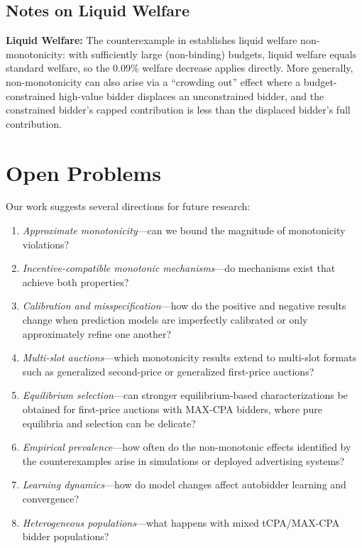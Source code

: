 \documentclass{article}
\theoremstyle{plain}
\theoremstyle{definition}
\theoremstyle{remark}
\begin{document}
\subsection{Notes on Liquid Welfare}
\label{app:counter-notes}

\textbf{Liquid Welfare:} The counterexample in  establishes liquid welfare non-monotonicity: with sufficiently large (non-binding) budgets, liquid welfare equals standard welfare, so the 0.09\% welfare decrease applies directly. More generally, non-monotonicity can also arise via a ``crowding out'' effect where a budget-constrained high-value bidder displaces an unconstrained bidder, and the constrained bidder's capped contribution is less than the displaced bidder's full contribution.

\section{Open Problems}
\label{app:open-problems}

Our work suggests several directions for future research:
\begin{enumerate}
    \item \emph{Approximate monotonicity}---can we bound the magnitude of monotonicity violations?
    \item \emph{Incentive-compatible monotonic mechanisms}---do mechanisms exist that achieve both properties?
    \item \emph{Calibration and misspecification}---how do the positive and negative results change when prediction models are imperfectly calibrated or only approximately refine one another?
    \item \emph{Multi-slot auctions}---which monotonicity results extend to multi-slot formats such as generalized second-price or generalized first-price auctions?
    \item \emph{Equilibrium selection}---can stronger equilibrium-based characterizations be obtained for first-price auctions with MAX-CPA bidders, where pure equilibria and selection can be delicate?
    \item \emph{Empirical prevalence}---how often do the non-monotonic effects identified by the counterexamples arise in simulations or deployed advertising systems?
    \item \emph{Learning dynamics}---how do model changes affect autobidder learning and convergence?
    \item \emph{Heterogeneous populations}---what happens with mixed tCPA/MAX-CPA bidder populations?
\end{enumerate}
\end{document}
